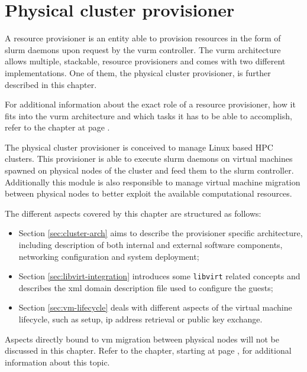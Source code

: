 \chapter{Physical cluster provisioner}
\label{sec:remotevirt}

A resource provisioner is an entity able to provision resources in the form of \gls{slurm} daemons upon request by the \gls{vurm} controller. The \gls{vurm} architecture allows multiple, stackable, resource provisioners and comes with two different implementations. One of them, the physical cluster provisioner, is further described in this chapter.

For additional information about the exact role of a resource provisioner, how it fits into the \gls{vurm} architecture and which tasks it has to be able to accomplish, refer to the \emph{} chapter at page \pageref{sec:architecture}.

The physical cluster provisioner is conceived to manage Linux based HPC clusters. This provisioner is able to execute \gls{slurm} daemons on virtual machines spawned on physical nodes of the cluster and feed them to the \gls{slurm} controller. Additionally this module is also responsible to manage virtual machine migration between physical nodes to better exploit the available computational resources.

The different aspects covered by this chapter are structured as follows:

\begin{itemize}
    \item Section \ref{sec:cluster-arch} aims to describe the provisioner specific architecture, including description of both internal and external software components, networking configuration and system deployment;
    \item Section \ref{sec:libvirt-integration} introduces some \texttt{libvirt} related concepts and describes the \gls{xml} domain description file used to configure the guests;
    \item Section \ref{sec:vm-lifecycle} deals with different aspects of the virtual machine lifecycle, such as setup, \gls{ip} address retrieval or public key exchange.
\end{itemize}

Aspects directly bound to \gls{vm} migration between physical nodes will not be discussed in this chapter. Refer to the \emph{} chapter, starting at page \pageref{sec:migration}, for additional information about this topic.



